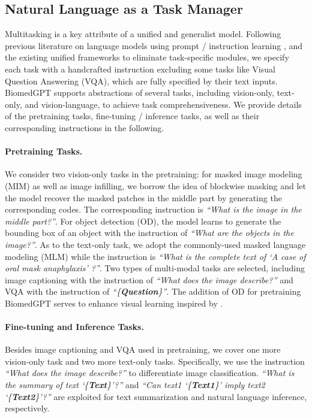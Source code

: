 \documentclass[10pt]{article} \usepackage[preprint]{tmlr}
\begin{document}
\subsection{Natural Language as a Task Manager}

Multitasking is a key attribute of a unified and generalist model. Following previous literature on language models using prompt / instruction learning \citep{brown2020language, liu2023pre, weifinetuned, gao2021making, schick2021s}, and the existing unified frameworks to eliminate task-specific modules, we specify each task with a handcrafted instruction excluding some tasks like Visual Question Answering (VQA), which are fully specified by their text inputs. BiomedGPT supports abstractions of several tasks, including vision-only, text-only, and vision-language, to achieve task comprehensiveness. We provide details of the pretraining tasks, fine-tuning / inference tasks, as well as their corresponding instructions in the following. 
\paragraph{Pretraining Tasks.} We consider two vision-only tasks in the pretraining: for masked image modeling (MIM) as well as image infilling, we borrow the idea of blockwise masking \citep{DBLP:conf/iclr/Bao0PW22} and let the model recover the masked patches in the middle part by generating the corresponding codes. The corresponding instruction is \textit{``What is the image in the middle part?''}. For object detection (OD), the model learns to generate the bounding box of an object with the instruction of \textit{``What are the objects in the image?''}. As to the text-only task, we adopt the commonly-used masked language modeling (MLM) while the instruction is \textit{``What is the complete text of `A case of oral mask anaphylaxis' ?''}. Two types of multi-modal tasks are selected, including image captioning with the instruction of \textit{``What does the image describe?''} and VQA with the instruction of \textit{``\{\textbf{Question}\}''}. The addition of OD for pretraining BiomedGPT serves to enhance visual learning inspired by \citep{xu2021e2e}.
\paragraph{Fine-tuning and Inference Tasks.} Besides image captioning and VQA used in pretraining, we cover one more vision-only task and two more text-only tasks. Specifically, we use the instruction \textit{``What does the image describe?''} to differentiate image classification. \textit{``What is the summary of text `\{\textbf{Text}\}'?''} and \textit{``Can text1 `\{\textbf{Text1}\}' imply text2 `\{\textbf{Text2}\}'?''} are exploited for text summarization and natural language inference, respectively. 
\end{document}
